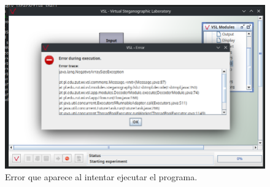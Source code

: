 \documentclass{article}
\begin{document}
\begin{figure}[H]
    \includegraphics[width=\textwidth]{imagenes/Screenshot_20221030_145831.png}
    \caption{Error que aparece al intentar ejecutar el programa.}
\end{figure}

%
%
%
%
%
%
%
%
\end{document}
